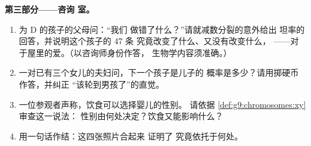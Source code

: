 \begin{problem}
\medskip\noindent\textbf{第三部分——咨询
室。}
\begin{enumerate}[resume]
  \item {}为 D 的孩子的父母问：“我们
        做错了什么？”请就减数分裂的意外给出
        坦率的回答，并说明这个孩子的 47 条
        究竟改变了什么、又没有改变什么，
        ——对于屋里的爱。（以咨询师身份作答，
        生物学内容须准确。）
  \item 一对已有三个女儿的夫妇问，下一个孩子是儿子的
        概率是多少？请用掷硬币作答，并纠正
        “该轮到男孩了”的直觉。
  \item 一位参观者声称，饮食可以选择婴儿的性别。
        请依据
        \cref{def:g9:chromosomes:xy}审查这一说法：
        性别由何处决定？饮食又能影响什么？
  \item 用一句话作结：这四张照片合起来
        证明了
        究竟依托于何处。
\end{enumerate}
\end{problem}
